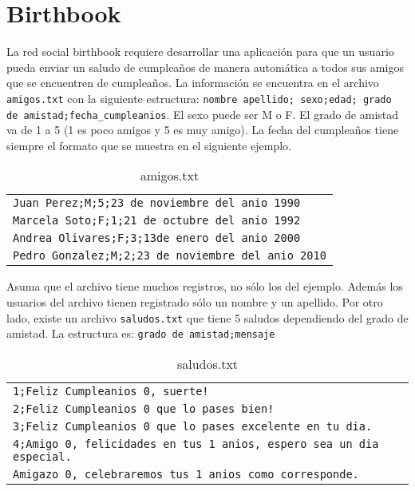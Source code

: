 \section{Birthbook}

La red social birthbook requiere desarrollar una aplicación para que un usuario pueda enviar un saludo de cumpleaños de manera automática a todos sus amigos que se encuentren de cumpleaños. La información se encuentra en el archivo \texttt{amigos.txt} con la siguiente estructura: \texttt{nombre apellido; sexo;edad; grado de amistad;fecha\_cumpleanios}. El sexo puede ser M o F. El grado de amistad va de 1 a 5 (1 es poco amigos y 5 es muy amigo). La fecha del cumpleaños tiene siempre el formato que se muestra en el siguiente ejemplo.

\begin{table}[h]
\centering
\caption{amigos.txt}
\begin{tabular}{|l|}
\hline
\texttt{Juan Perez;M;5;23 de noviembre del anio 1990    } \\
\texttt{Marcela Soto;F;1;21 de octubre del anio 1992    } \\
\texttt{Andrea Olivares;F;3;13de enero del anio 2000     }\\
\texttt{Pedro Gonzalez;M;2;23 de noviembre del anio 2010} \\ \hline
\end{tabular}
\end{table}

Asuma que el archivo tiene muchos registros, no sólo los del ejemplo. Además los usuarios del archivo tienen registrado sólo un nombre y un apellido. Por otro lado, existe un archivo \texttt{saludos.txt} que tiene 5 saludos dependiendo del grado de amistad. La estructura es: \texttt{grado de amistad;mensaje}

\begin{table}[h]
\centering
\caption{saludos.txt}
\begin{tabular}{|l|}
\hline
\texttt{1;Feliz Cumpleanios {0}, suerte!} \\
\texttt{2;Feliz Cumpleanios {0} que lo pases bien!} \\
\texttt{3;Feliz Cumpleanios {0} que lo pases excelente en tu dia.}\\
\texttt{4;Amigo {0}, felicidades en tus {1} anios, espero sea un dia especial.} \\
\texttt{Amigazo {0}, celebraremos tus {1} anios como corresponde.}\\ \hline
\end{tabular}
\end{table}

